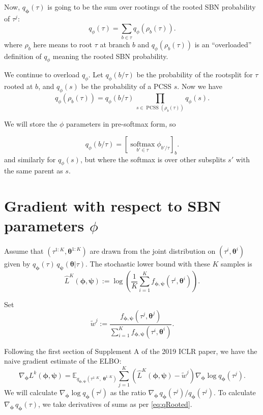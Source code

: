 \documentclass{article}
\newcommand{\softmax}{\operatorname*{softmax}}
\newcommand{\PCSS}{\operatorname{PCSS}}
\begin{document}
Now, $q_{\bm{\phi}}(\tau)$ is going to be the sum over rootings of the rooted SBN probability of $\tau^j$:
\[
    q_\phi(\tau) = \sum_{b \in \tau} q_\phi(\rho_b(\tau)).
\]
where $\rho_b$ here means to root $\tau$ at branch $b$ and $q_\phi(\rho_b(\tau))$ is an ``overloaded'' definition of $q_\phi$ meaning the rooted SBN probability.

We continue to overload $q_\phi$.
Let $q_\phi(b \slash \tau)$ be the probability of the rootsplit for $\tau$ rooted at $b$, and
$q_\phi(s)$ be the probability of a PCSS $s$.
Now we have
\begin{equation}
    q_\phi(\rho_b(\tau)) = q_\phi(b \slash \tau) \, \prod_{s \in \PCSS(\rho_b(\tau))} q_\phi(s).
    \label{eq:qRooted}
\end{equation}

We will store the $\phi$ parameters in pre-softmax form, so

\[
    q_\phi(b \slash \tau) = \left[ \softmax_{b' \in \tau} \phi_{b' \slash \tau} \right]_b .
\]
and similarly for $q_\phi(s)$, but where the softmax is over other subsplits $s'$ with the same parent as $s$.


\section*{Gradient with respect to SBN parameters $\phi$}

Assume that $(\tau^{1:K}, \bm \theta^{1:K})$ are drawn from the joint distribution on $(\tau^i, \bm \theta^i)$ given by $q_{\bm{\phi}}(\tau)\, q_{\bm{\psi}}(\bm{\theta}|\tau)$.
The stochastic lower bound with these $K$ samples is
\[
    \hat{L}^K(\bm{\phi},{\bm{\psi}}) :=
    \log\left( \frac{1}{K} \sum_{i=1}^K f_{\bm{\phi},{\bm{\psi}}}(\tau^i, \bm \theta^i) \right).
\]

Set
\[
    \tilde{w}^j :=
    \frac{f_{\bm{\phi},{\bm{\psi}}}(\tau^j, \bm \theta^j)}
    {\sum_{i=1}^K f_{\bm{\phi},{\bm{\psi}}}(\tau^i, \bm \theta^i)}.
\]

Following the first section of Supplement A of the 2019 ICLR paper, we have the naive gradient estimate of the ELBO:
\[
\nabla_{{\bm{\phi}}}L^k({\bm{\phi}},{\bm{\psi}}) = \mathbb{E}_{q_{{\bm{\phi}},{\bm{\psi}}}(\tau^{1:K},\; {\bm{\theta}}^{1:K})} \sum_{j=1}^K \left(\hat{L}^K({\bm{\phi}},{\bm{\psi}}) - \tilde{w}^j\right) \nabla_{\bm{\phi}} \log q_{\bm{\phi}}(\tau^j).
\]
We will calculate $\nabla_{\bm \phi} \log q_{\bm \phi}(\tau^j)$ as the ratio ${\nabla_{\bm \phi} \, q_{\bm{\phi}}(\tau^j)} / {q_{\bm{\phi}}(\tau^j)}$.
To calculate $\nabla_{\bm \phi} \, q_{\bm{\phi}}(\tau)$, we take derivatives of sums as per \eqref{eq:qRooted}.
\end{document}
